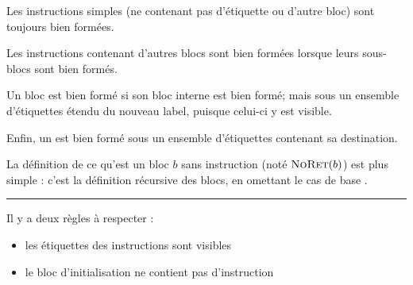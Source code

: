Les instructions simples (ne contenant pas d'étiquette ou d'autre bloc) sont
toujours bien formées.


Les instructions contenant d'autres blocs sont bien formées lorsque leurs
sous-blocs sont bien formés.


Un bloc \phxx{\npkDoWith} est bien formé si son bloc interne est bien formé;
mais sous un ensemble d'étiquettes étendu du nouveau label, puisque celui-ci y
est visible.

\begin{mathpar}
\end{mathpar}

Enfin, un \phx{\npkGoto} est bien formé sous un ensemble d'étiquettes contenant
sa destination.

\begin{mathpar}
\end{mathpar}

La définition de ce qu'est un bloc $b$ sans instruction \phx{\npkReturn} (noté
$\NORET{b}$) est plus simple : c'est la définition récursive des blocs, en
omettant le cas de base \phx{\npkReturn}.


\begin{center}\rule{3in}{0.4pt}\end{center}

Il y a deux règles à respecter :

\begin{itemize}
\item
  les étiquettes des instructions \phx{\npkGoto} sont visibles
\item
  le bloc d'initialisation ne contient pas d'instruction
  \phx{\npkReturn}
\end{itemize}
